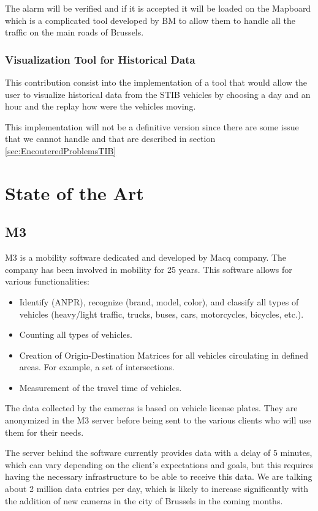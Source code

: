 \documentclass[12pt]{report}
\begin{document}
	The alarm will be verified and if it is accepted it will be loaded on the Mapboard which is a complicated tool developed by BM to allow them to handle all the traffic on the main roads of Brussels.
	
	\subsection{Visualization Tool for Historical Data}
	
	This contribution consist into the implementation of a tool that would allow the user to visualize historical data from the STIB vehicles by choosing a day and an hour and the replay how were the vehicles moving.
	
	This implementation will not be a definitive version since there are some issue that we cannot handle and that are described in section  
	\ref{sec:EncouteredProblemsTIB}
	
	
	\chapter{State of the Art}
	
	\section{M3}
	\label{sec:M3}
	
	M3 is a mobility software dedicated and developed by Macq company. The company has been involved in mobility for 25 years. This software allows for various functionalities:
	
	
	\begin{itemize}[noitemsep]
		\item Identify (ANPR), recognize (brand, model, color), and classify all types of vehicles (heavy/light traffic, trucks, buses, cars, motorcycles, bicycles, etc.).
		\item Counting all types of vehicles.
		\item Creation of Origin-Destination Matrices for all vehicles circulating in defined areas. For example, a set of intersections.
		\item Measurement of the travel time of vehicles.
	\end{itemize}
	
	The data collected by the cameras is based on vehicle license plates. They are anonymized in the M3 server before being sent to the various clients who will use them for their needs.
	
	The server behind the software currently provides data with a delay of 5 minutes, which can vary depending on the client's expectations and goals, but this requires having the necessary infrastructure to be able to receive this data. We are talking about 2 million data entries per day, which is likely to increase significantly with the addition of new cameras in the city of Brussels in the coming months.
	
\end{document}
